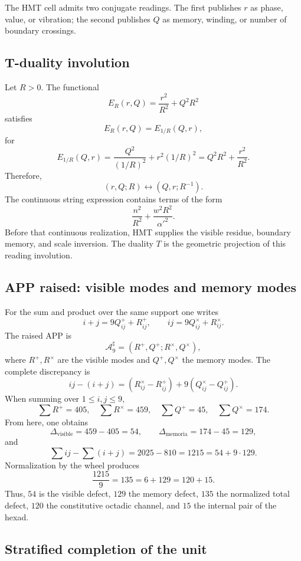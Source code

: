 \begin{principle}
The HMT cell admits two conjugate readings. The first publishes \(r\) as
phase, value, or vibration; the second publishes \(Q\) as memory,
winding, or number of boundary crossings.
\end{principle}

\subsection{T-duality involution}

Let \(R>0\). The functional
\[
E_R(r,Q)=\frac{r^2}{R^2}+Q^2R^2
\]
satisfies
\[
E_R(r,Q)=E_{1/R}(Q,r),
\]
for
\[
E_{1/R}(Q,r)
=\frac{Q^2}{(1/R)^2}+r^2(1/R)^2
=Q^2R^2+\frac{r^2}{R^2}.
\]
Therefore,
\[
(r,Q;R)\longleftrightarrow(Q,r;R^{-1}).
\]
The continuous string expression contains terms of the form
\[
\frac{n^2}{R^2}+\frac{w^2R^2}{\alpha'^2}.
\]
Before that continuous realization, HMT supplies the visible residue, boundary
memory, and scale inversion. The duality \(T\) is the geometric
projection of this reading involution.

\subsection{APP raised: visible modes and memory modes}

For the sum and product over the same support one writes
\[
i+j=9Q^+_{ij}+R^+_{ij},
\qquad
ij=9Q^\times_{ij}+R^\times_{ij}.
\]
The raised APP is
\[
\mathcal A_9^\sharp=(R^+,Q^+;R^\times,Q^\times),
\]
where \(R^+,R^\times\) are the visible modes and
\(Q^+,Q^\times\) the memory modes. The complete discrepancy is
\[
ij-(i+j)
=(R^\times_{ij}-R^+_{ij})
+9(Q^\times_{ij}-Q^+_{ij}).
\]
When summing over \(1\leq i,j\leq9\),
\[
\sum R^+=405,
\quad
\sum R^\times=459,
\quad
\sum Q^+=45,
\quad
\sum Q^\times=174.
\]
From here, one obtains
\[
\Delta_{\mathrm{visible}}=459-405=54,
\qquad
\Delta_{\mathrm{memoria}}=174-45=129,
\]
and
\[
\sum ij-\sum(i+j)=2025-810=1215=54+9\cdot129.
\]
Normalization by the wheel produces
\[
\frac{1215}{9}=135=6+129=120+15.
\]
Thus, \(54\) is the visible defect, \(129\) the memory defect,
\(135\) the normalized total defect, \(120\) the constitutive octadic channel,
and \(15\) the internal pair of the hexad.

\subsection{Stratified completion of the unit}

